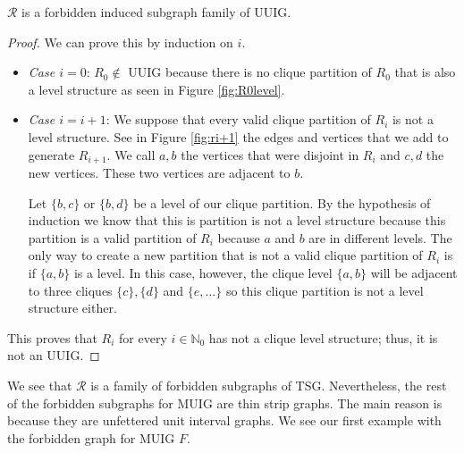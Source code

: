 \begin{theorem}
  $\mathcal{R}$ is a forbidden induced subgraph family of UUIG.
\end{theorem}

\begin{proof}
  We can prove this by induction on $i$.

  \begin{itemize}
    \item \emph{Case $i=0$}: $R_0 \notin$ UUIG because there is no clique partition of $R_0$ that is also a level structure as seen in Figure \ref{fig:R0level}.
    \item \emph{Case $i = i+1$}: We suppose that every valid clique partition of $R_i$ is not a level structure. See in Figure \ref{fig:ri+1} the edges and vertices that we add to generate $R_{i+1}$. We call $a,b$ the vertices that were disjoint in $R_i$ and $c,d$ the new vertices. These two vertices are adjacent to $b$.

    Let $\{b,c\}$ or $\{b,d\}$ be a level of our clique partition. By the hypothesis of induction we know that this is partition is not a level structure because this partition is a valid partition of $R_i$ because $a$ and $b$ are in different levels. The only way to create a new partition that is not a valid clique partition of $R_i$ is if $\{a,b\}$ is a level. In this case, however, the clique level $\{a,b\}$ will be adjacent to three cliques $\{c\}, \{d\}$ and $\{e, \dots\}$ so this clique partition is not a level structure either.
  \end{itemize}

  This proves that $R_i$ for every $i \in \mathbb{N}_0$ has not a clique level structure; thus, it is not an UUIG.
\end{proof}

We see that $\mathcal{R}$ is a family of forbidden subgraphs of TSG. Nevertheless, the rest of the forbidden subgraphs for MUIG are thin strip graphs. The main reason is because they are unfettered unit interval graphs. We see our first example with the forbidden graph for MUIG $F$.

